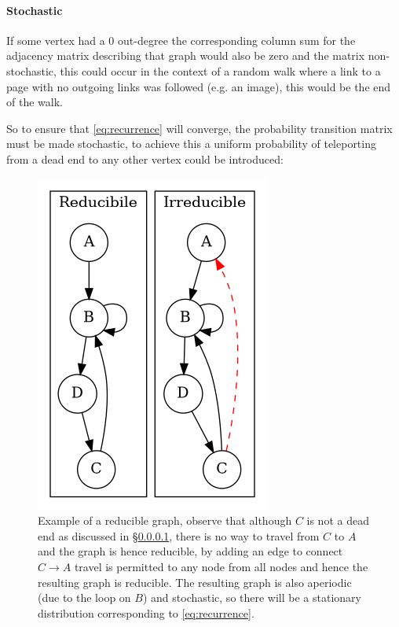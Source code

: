\documentclass[11pt]{report}
\begin{document}
\paragraph{Stochastic}
\label{stochastic}
If some vertex had a 0 out-degree the corresponding column sum for the adjacency
matrix describing that graph would also be zero and the matrix non-stochastic,
this could occur in the context of a random walk where a link to a page with no
outgoing links was followed (e.g. an image), this would be the end of the
walk.

So to ensure that \eqref{eq:recurrence} will converge, the probability transition
matrix must be made stochastic, to achieve this a uniform probability of teleporting from a dead end to any other vertex could be introduced:


 \begin{figure}
     \includegraphics[width=\0.38\textwidth]{media/dot/reducible_graph_example.dot.png}
     \caption{\label{irreducible-example}Example of a reducible graph, observe that although \(C\) is not a dead end as discussed in \S \ref{stochastic}, there is no way to travel from \(C\) to \(A\) and the graph is hence reducible, by adding an edge to connect \(C\rightarrow A\) travel is permitted to any node from all nodes and hence the resulting graph is reducible. The resulting graph is also aperiodic (due to the loop on \(B\)) and stochastic, so there will be a stationary distribution corresponding to \eqref{eq:recurrence}.}
 \end{figure}
\end{document}

